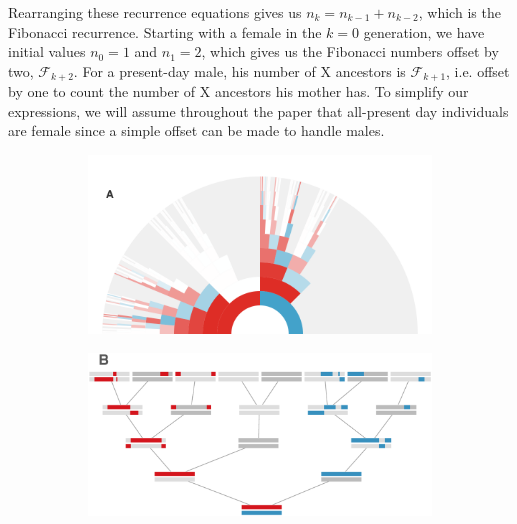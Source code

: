 \documentclass[9pt,twocolumn,twoside]{gsajnl}
\begin{document}
Rearranging these recurrence equations gives us $n_k = n_{k-1} + n_{k-2}$,
which is the Fibonacci recurrence. Starting with a female in the $k=0$
generation, we have initial values $n_0=1$ and $n_1 = 2$, which gives us the
Fibonacci numbers offset by two, $\mathcal{F}_{k+2}$. For a present-day male,
his number of X ancestors is $\mathcal{F}_{k+1}$, i.e. offset by one to count
the number of X ancestors his mother has. To simplify our expressions, we will
assume throughout the paper that all-present day individuals are female since a
simple offset can be made to handle males.


\begin{figure}[!ht]
    \centering
    \begin{subfigure}[b]{0.49\textwidth}
      \includegraphics[width=\textwidth]{images/x-arc}
    \end{subfigure}
    \begin{subfigure}[b]{0.49\textwidth}
      \includegraphics[width=\textwidth]{images/x-tree}
    \end{subfigure}
    

\end{figure}
\end{document}
